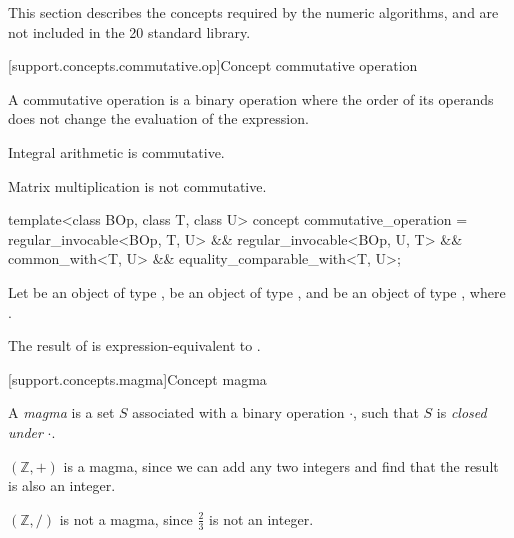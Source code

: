 This section describes the concepts required by the numeric algorithms, and are not included in the
\Cpp{}20 standard library.

[support.concepts.commutative.op]{Concept commutative operation}

\pnum
A commutative operation is a binary operation where the order of its operands does not change the
evaluation of the expression.

\pnum
\begin{example}
   Integral arithmetic is commutative.
\end{example}

\pnum
\begin{example}
   Matrix multiplication is not commutative.
\end{example}

\begin{itemdecl}
  template<class BOp, class T, class U>
  concept commutative_operation =
    regular_invocable<BOp, T, U> &&
    regular_invocable<BOp, U, T> &&
    common_with<T, U> &&
    equality_comparable_with<T, U>;
\end{itemdecl}
\begin{itemdescr}
   \pnum
   Let  be an object of type ,  be an object of type , and
    be an object of type , where .

   \pnum
   The result of  is expression-equivalent to .
\end{itemdescr}

[support.concepts.magma]{Concept magma}

\pnum
A \textit{magma} is a set $S$ associated with a binary operation $\cdot$, such that $S$ is
\textit{closed under} $\cdot$.

\pnum
\begin{example}
   $(\mathbb{Z}, +)$ is a magma, since we can add any two integers and find that the result is also
   an integer.
\end{example}

\pnum
\begin{example}
   $(\mathbb{Z}, /)$ is not a magma, since $\frac{2}{3}$ is not an integer.
\end{example}


